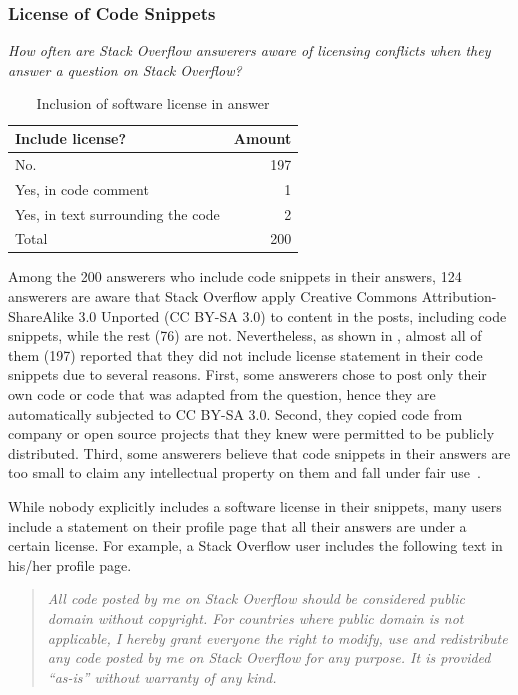\documentclass[10pt,journal,compsoc]{IEEEtran}
\begin{document}
\subsubsection{License of Code Snippets} 
\vspace{0.25cm}
\textit{How often are Stack Overflow
	answerers aware of licensing conflicts when
	they answer a question on Stack Overflow?} 
\vspace{0.25cm}

\begin{table}
	\centering
	\caption{Inclusion of software license in answer}
	\label{tab:survey_license_include}
	\begin{tabular}{lr}
		\toprule
		Include license? & Amount \\
		\midrule
		No. & 197 \\
		Yes, in code comment &	1 \\
		Yes, in text surrounding the code & 2 \\
		\midrule
		Total & 200 \\
		\bottomrule
	\end{tabular}
\end{table}

Among the 200 answerers who include code snippets in their answers, 124
answerers are aware that Stack Overflow apply Creative Commons
Attribution-ShareAlike 3.0 Unported (CC BY-SA 3.0) to content in the posts,
including code snippets, while the rest (76) are not. Nevertheless, as shown in
, almost all of them (197) reported that they
did not include license statement in their code snippets due to several reasons.
First, some answerers chose to post only their own code or code that was adapted
from the question, hence they are automatically subjected to CC BY-SA 3.0.
Second, they copied code from company or open source projects that they knew
were permitted to be publicly distributed. Third, some answerers believe that
code snippets in their answers are too small to claim any intellectual property
on them and fall under fair use~\cite{fairuse}.

While nobody explicitly includes a software license in their snippets,
many users include a statement on their profile page that all their
answers are under a certain license. For example, a Stack Overflow user includes 
the following text in his/her profile page.

\begin{quotation}
\textit{All code posted by me on
	Stack Overflow should be considered public domain without copyright. For
	countries where public domain is not applicable, I hereby grant everyone the
	right to modify, use and redistribute any code posted by me on Stack Overflow
	for any purpose. It is provided ``as-is'' without warranty of any kind.}
\end{quotation}
\end{document}
